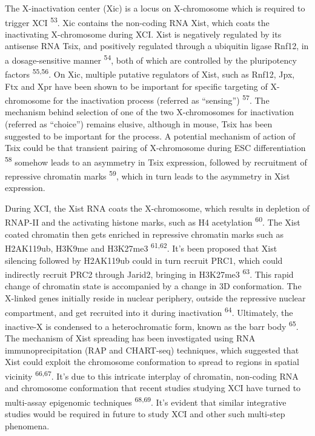 \documentclass[11pt,twoside]{MPIthesis}
\theoremstyle{definition}
\theoremstyle{definition}
\theoremstyle{definition}
\theoremstyle{remark}
\begin{document}
The X-inactivation center (Xic) is a locus on X-chromosome which is
required to trigger XCI \textsuperscript{53}. Xic contains the
non-coding RNA Xist, which coats the inactivating X-chromosome during
XCI. Xist is negatively regulated by its antisense RNA Tsix, and
positively regulated through a ubiquitin ligase Rnf12, in a
dosage-sensitive manner \textsuperscript{54}, both of which are
controlled by the pluripotency factors \textsuperscript{55,56}. On Xic,
multiple putative regulators of Xist, such as Rnf12, Jpx, Ftx and Xpr
have been shown to be important for specific targeting of X-chromosome
for the inactivation process (referred as ``sensing'')
\textsuperscript{57}. The mechanism behind selection of one of the two
X-chromosomes for inactivation (referred as ``choice'') remains elusive,
although in mouse, Tsix has been suggested to be important for the
process. A potential mechanism of action of Tsix could be that transient
pairing of X-chromosome during ESC differentiation \textsuperscript{58}
somehow leads to an asymmetry in Tsix expression, followed by
recruitment of repressive chromatin marks \textsuperscript{59}, which in
turn leads to the asymmetry in Xist expression.

During XCI, the Xist RNA coats the X-chromosome, which results in
depletion of RNAP-II and the activating histone marks, such as H4
acetylation \textsuperscript{60}. The Xist coated chromatin then gets
enriched in repressive chromatin marks such as H2AK119ub, H3K9me and
H3K27me3 \textsuperscript{61,62}. It's been proposed that Xist silencing
followed by H2AK119ub could in turn recruit PRC1, which could indirectly
recruit PRC2 through Jarid2, bringing in H3K27me3 \textsuperscript{63}.
This rapid change of chromatin state is accompanied by a change in 3D
conformation. The X-linked genes initially reside in nuclear periphery,
outside the repressive nuclear compartment, and get recruited into it
during inactivation \textsuperscript{64}. Ultimately, the inactive-X is
condensed to a heterochromatic form, known as the barr body
\textsuperscript{65}. The mechanism of Xist spreading has been
investigated using RNA immunoprecipitation (RAP and CHART-seq)
techniques, which suggested that Xist could exploit the chromosome
conformation to spread to regions in spatial vicinity
\textsuperscript{66,67}. It's due to this intricate interplay of
chromatin, non-coding RNA and chromosome conformation that recent
studies studying XCI have turned to multi-assay epigenomic techniques
\textsuperscript{68,69}. It's evident that similar integrative studies
would be required in future to study XCI and other such multi-step
phenomena.
\end{document}
